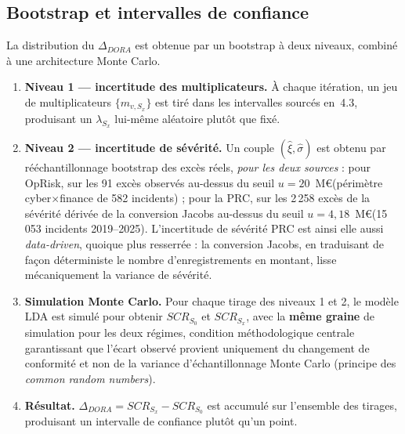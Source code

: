 \documentclass[11pt,a4paper]{article}
\theoremstyle{navystyle}
\theoremstyle{navydef}
\begin{document}
\subsection{Bootstrap et intervalles de confiance}

La distribution du $\Delta_{DORA}$ est obtenue par un bootstrap à deux
niveaux, combiné à une architecture Monte Carlo.

\begin{enumerate}[topsep=4pt]
\item \textbf{Niveau 1 --- incertitude des multiplicateurs.} À chaque
itération, un jeu de multiplicateurs $\{m_{v,S_x}\}$ est tiré dans les
intervalles sourcés en~4.3, produisant un $\lambda_{S_x}$ lui-même
aléatoire plutôt que fixé.
\item \textbf{Niveau 2 --- incertitude de sévérité.} Un couple
$(\hat\xi, \hat\sigma)$ est obtenu par rééchantillonnage bootstrap des excès
réels, \emph{pour les deux sources} : pour OpRisk, sur les 91 excès observés
au-dessus du seuil $u = 20$~M\euro (périmètre cyber$\times$finance de 582
incidents) ; pour la PRC, sur les 2\,258 excès de la sévérité dérivée de la
conversion Jacobs au-dessus du seuil $u = 4{,}18$~M\euro (15\,053 incidents
2019--2025). L'incertitude de sévérité PRC est ainsi elle aussi
\emph{data-driven}, quoique plus resserrée : la conversion Jacobs, en
traduisant de façon déterministe le nombre d'enregistrements en montant,
lisse mécaniquement la variance de sévérité.
\item \textbf{Simulation Monte Carlo.} Pour chaque tirage des niveaux 1 et
2, le modèle LDA est simulé pour obtenir $SCR_{S_0}$ et $SCR_{S_x}$, avec la
\textbf{même graine} de simulation pour les deux régimes, condition
méthodologique centrale garantissant que l'écart observé provient
uniquement du changement de conformité et non de la variance
d'échantillonnage Monte Carlo (principe des \emph{common random numbers}).
\item \textbf{Résultat.} $\Delta_{DORA} = SCR_{S_x} - SCR_{S_0}$ est
accumulé sur l'ensemble des tirages, produisant un intervalle de confiance
plutôt qu'un point.
\end{enumerate}
\end{document}
